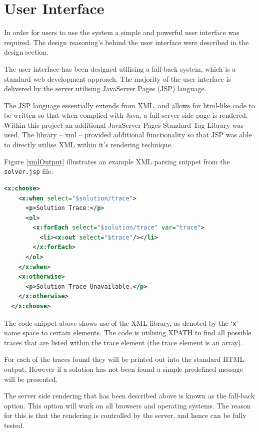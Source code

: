 \section{User Interface}
\label{sec:imp_user_interface}

In order for users to use the system a simple and powerful user interface was 
required. The design reasoning's behind the user interface were described in 
the design section.

The user interface has been designed utilising a fall-back system, which is a 
standard web development approach. The majority of the user interface is 
delivered by the server utilising JavaServer Pages (JSP) language.

The JSP language essentially extends from XML, and allows for html-like code to 
be written so that when complied with Java, a full server-side page is rendered.
Within this project an additional JavaServer Pages Standard Tag Library was 
used. The library -- xml -- provided additional functionality so that JSP was 
able to directly utilise XML within it's rendering technique.

Figure \ref{xmlOutput} illustrates an example XML parsing snippet from the 
\texttt{solver.jsp} file.

\begin{lstlisting}[language=XML, 
                   caption={isPatternValid deduces if a given solution pattern 
                            is valid}, 
                   label=xmlOutput] 
  <x:choose>
    <x:when select="$solution/trace">
      <p>Solution Trace:</p>
      <ol>
        <x:forEach select="$solution/trace" var="trace">
          <li><x:out select="$trace"/></li>
        </x:forEach>
      </ol>
    </x:when>
    <x:otherwise>
      <p>Solution Trace Unavailable.</p>
    </x:otherwise>
  </x:choose>
\end{lstlisting}

The code snippet above shows use of the XML library, as denoted by the 
`\texttt{x}' name space to certain elements. The code is utilising XPATH to find
all possible traces that are listed within the trace element (the trace element 
is an array).

For each of the traces found they will be printed out into the standard HTML 
output. However if a solution has not been found a simple predefined message 
will be presented.

The server side rendering that has been described above is known as the 
fall-back option. This option will work on all browsers and operating systems. 
The reason for this is that the rendering is controlled by the server, and hence
can be fully tested.

